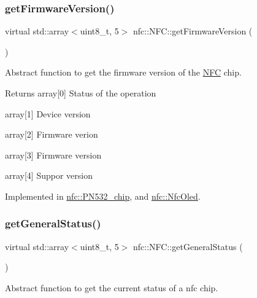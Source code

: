 \subsubsection{\texorpdfstring{get\+Firmware\+Version()}{getFirmwareVersion()}}
{\footnotesize\ttfamily virtual std\+::array$<$uint8\+\_\+t, 5$>$ nfc\+::\+N\+F\+C\+::get\+Firmware\+Version (\begin{DoxyParamCaption}{ }\end{DoxyParamCaption})\hspace{0.3cm}{\ttfamily [pure virtual]}}



Abstract function to get the firmware version of the \hyperlink{classnfc_1_1NFC}{N\+FC} chip. 

\begin{DoxyReturn}{Returns}
array\mbox{[}0\mbox{]} Status of the operation 

array\mbox{[}1\mbox{]} Device version 

array\mbox{[}2\mbox{]} Firmware verion 

array\mbox{[}3\mbox{]} Firmware version 

array\mbox{[}4\mbox{]} Suppor version 
\end{DoxyReturn}


Implemented in \hyperlink{classnfc_1_1PN532__chip_a00764b6b9472c89430bb1503ec1bf08b}{nfc\+::\+P\+N532\+\_\+chip}, and \hyperlink{classnfc_1_1NfcOled_add83fefdd3a5eadc6f85617173d08336}{nfc\+::\+Nfc\+Oled}.

\mbox{\label{classnfc_1_1NFC_a4ee83726542bf5f25eacb9feaccefd28}} 
\subsubsection{\texorpdfstring{get\+General\+Status()}{getGeneralStatus()}}
{\footnotesize\ttfamily virtual std\+::array$<$uint8\+\_\+t, 5$>$ nfc\+::\+N\+F\+C\+::get\+General\+Status (\begin{DoxyParamCaption}{ }\end{DoxyParamCaption})\hspace{0.3cm}{\ttfamily [pure virtual]}}



Abstract function to get the current status of a nfc chip. 

